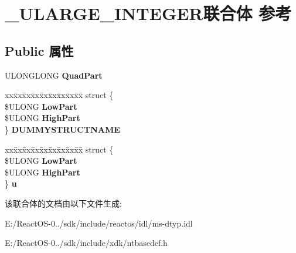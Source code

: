 \hypertarget{struct___u_l_a_r_g_e___i_n_t_e_g_e_r}{}\section{\+\_\+\+U\+L\+A\+R\+G\+E\+\_\+\+I\+N\+T\+E\+G\+E\+R联合体 参考}
\label{struct___u_l_a_r_g_e___i_n_t_e_g_e_r}
\subsection*{Public 属性}
\begin{DoxyCompactItemize}
\item 
\mbox{\label{struct___u_l_a_r_g_e___i_n_t_e_g_e_r_a7ae780962edda02f62e317a572b28f7d}} 
U\+L\+O\+N\+G\+L\+O\+NG {\bfseries Quad\+Part}
\item 
\mbox{\label{struct___u_l_a_r_g_e___i_n_t_e_g_e_r_afe95fae999e3ef0cb1e76e8fc1889324}} 
\begin{tabbing}
xx\=xx\=xx\=xx\=xx\=xx\=xx\=xx\=xx\=\kill
struct \{\\
\>\$ULONG {\bfseries LowPart}\\
\>\$ULONG {\bfseries HighPart}\\
\} {\bfseries DUMMYSTRUCTNAME}\\

\end{tabbing}\item 
\mbox{\label{struct___u_l_a_r_g_e___i_n_t_e_g_e_r_a6dd35ed4cf7519a10b045e5deb127ff8}} 
\begin{tabbing}
xx\=xx\=xx\=xx\=xx\=xx\=xx\=xx\=xx\=\kill
struct \{\\
\>\$ULONG {\bfseries LowPart}\\
\>\$ULONG {\bfseries HighPart}\\
\} {\bfseries u}\\

\end{tabbing}\end{DoxyCompactItemize}


该联合体的文档由以下文件生成\+:\begin{DoxyCompactItemize}
\item 
E\+:/\+React\+O\+S-\/0../sdk/include/reactos/idl/ms-\/dtyp.\+idl\item 
E\+:/\+React\+O\+S-\/0../sdk/include/xdk/ntbasedef.\+h\end{DoxyCompactItemize}
